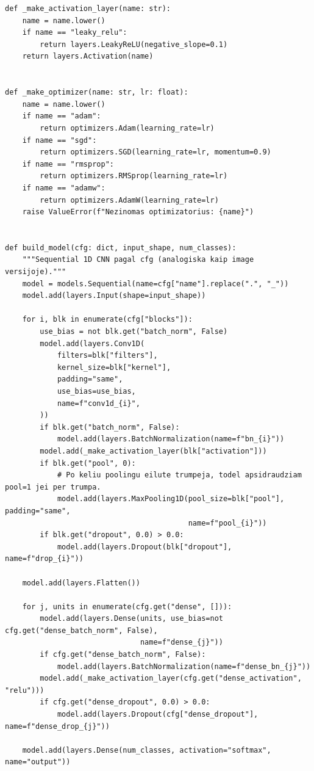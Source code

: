 \documentclass[]{VUMIFTemplateClass}
\begin{document}
\begin{verbatim}
def _make_activation_layer(name: str):
    name = name.lower()
    if name == "leaky_relu":
        return layers.LeakyReLU(negative_slope=0.1)
    return layers.Activation(name)


def _make_optimizer(name: str, lr: float):
    name = name.lower()
    if name == "adam":
        return optimizers.Adam(learning_rate=lr)
    if name == "sgd":
        return optimizers.SGD(learning_rate=lr, momentum=0.9)
    if name == "rmsprop":
        return optimizers.RMSprop(learning_rate=lr)
    if name == "adamw":
        return optimizers.AdamW(learning_rate=lr)
    raise ValueError(f"Nezinomas optimizatorius: {name}")


def build_model(cfg: dict, input_shape, num_classes):
    """Sequential 1D CNN pagal cfg (analogiska kaip image versijoje)."""
    model = models.Sequential(name=cfg["name"].replace(".", "_"))
    model.add(layers.Input(shape=input_shape))

    for i, blk in enumerate(cfg["blocks"]):
        use_bias = not blk.get("batch_norm", False)
        model.add(layers.Conv1D(
            filters=blk["filters"],
            kernel_size=blk["kernel"],
            padding="same",
            use_bias=use_bias,
            name=f"conv1d_{i}",
        ))
        if blk.get("batch_norm", False):
            model.add(layers.BatchNormalization(name=f"bn_{i}"))
        model.add(_make_activation_layer(blk["activation"]))
        if blk.get("pool", 0):
            # Po keliu poolingu eilute trumpeja, todel apsidraudziam pool=1 jei per trumpa.
            model.add(layers.MaxPooling1D(pool_size=blk["pool"], padding="same",
                                          name=f"pool_{i}"))
        if blk.get("dropout", 0.0) > 0.0:
            model.add(layers.Dropout(blk["dropout"], name=f"drop_{i}"))

    model.add(layers.Flatten())

    for j, units in enumerate(cfg.get("dense", [])):
        model.add(layers.Dense(units, use_bias=not cfg.get("dense_batch_norm", False),
                               name=f"dense_{j}"))
        if cfg.get("dense_batch_norm", False):
            model.add(layers.BatchNormalization(name=f"dense_bn_{j}"))
        model.add(_make_activation_layer(cfg.get("dense_activation", "relu")))
        if cfg.get("dense_dropout", 0.0) > 0.0:
            model.add(layers.Dropout(cfg["dense_dropout"], name=f"dense_drop_{j}"))

    model.add(layers.Dense(num_classes, activation="softmax", name="output"))


\end{verbatim}
\end{document}
